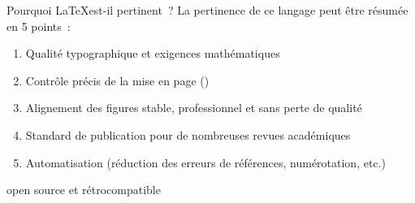 \begin{frame}{Pourquoi \LaTeX\;est-il pertinent~?}
    La pertinence de ce langage peut être résumée en 5 points~:
    \vfill
    \begin{enumerate}
        \item Qualité typographique et exigences mathématiques
        \item Contrôle précis de la mise en page ()
        \item Alignement des figures stable, professionnel et sans
        perte de qualité
        \item Standard de publication pour de nombreuses revues académiques
        \item Automatisation (réduction des erreurs de références, numérotation, etc.)
    \end{enumerate}
    \vfill
    \centering
    \begin{mylittlegreenbox}
        \Large\PointingHand\;open source et rétrocompatible
    \end{mylittlegreenbox}
\end{frame}
